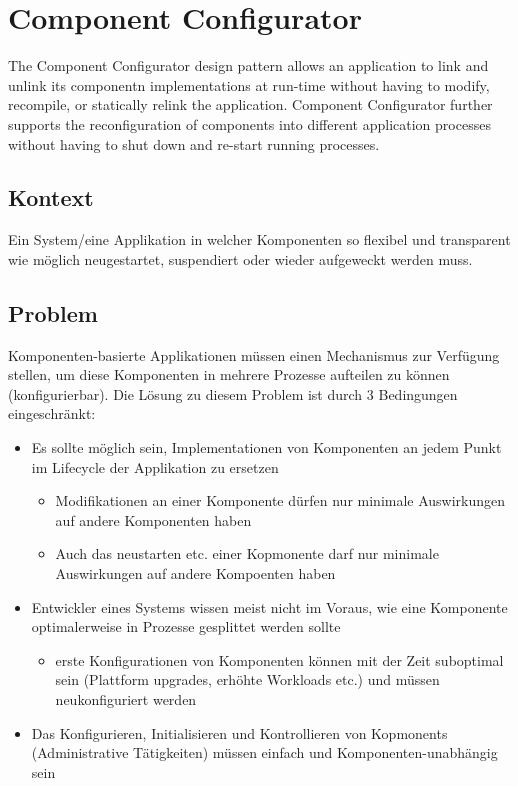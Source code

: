 \section{Component Configurator}

The Component Configurator design pattern allows an application to link and unlink its componentn implementations at run-time without having to modify, recompile, or statically relink the application. Component Configurator further supports the reconfiguration of components into different application processes without having to shut down and re-start running processes.

\subsection{Kontext}

Ein System/eine Applikation in welcher Komponenten so flexibel und transparent wie möglich neugestartet, suspendiert oder wieder aufgeweckt werden muss.

\subsection{Problem}

Komponenten-basierte Applikationen müssen einen Mechanismus zur Verfügung stellen, um diese Komponenten in mehrere Prozesse aufteilen zu können (konfigurierbar).
Die Lösung zu diesem Problem ist durch 3 Bedingungen eingeschränkt:

\begin{itemize}
	\item Es sollte möglich sein, Implementationen von Komponenten an jedem Punkt im Lifecycle der Applikation zu ersetzen
	\begin{itemize}
		\item Modifikationen an einer Komponente dürfen nur minimale Auswirkungen auf andere Komponenten haben
		\item Auch das neustarten etc. einer Kopmonente darf nur minimale Auswirkungen auf andere Kompoenten haben
	\end{itemize}
	\item Entwickler eines Systems wissen meist nicht im Voraus, wie eine Komponente optimalerweise in Prozesse gesplittet werden sollte
	\begin{itemize}
		\item erste Konfigurationen von Komponenten können mit der Zeit suboptimal sein (Plattform upgrades, erhöhte Workloads etc.) und müssen neukonfiguriert werden
	\end{itemize}
	\item Das Konfigurieren, Initialisieren und Kontrollieren von Kopmonents (Administrative Tätigkeiten) müssen einfach und Komponenten-unabhängig sein
\end{itemize}

